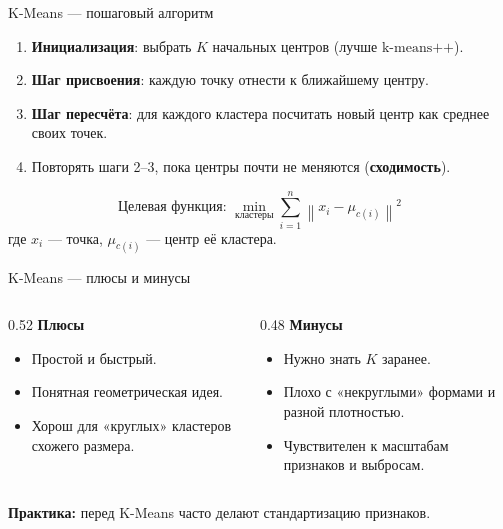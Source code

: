 \documentclass[aspectratio=169]{beamer}
\newcommand{\term}[1]{\textbf{#1}}
\begin{document}
\begin{frame}{K-Means — пошаговый алгоритм}
	\begin{enumerate}
		\item \term{Инициализация}: выбрать \(K\) начальных центров (лучше \(\text{k-means++}\)).
		\item \term{Шаг присвоения}: каждую точку отнести к ближайшему центру.
		\item \term{Шаг пересчёта}: для каждого кластера посчитать новый центр как среднее своих точек.
		\item Повторять шаги 2–3, пока центры почти не меняются (\term{сходимость}).
	\end{enumerate}
	\vspace{0.5em}
	\[
		\text{Целевая функция: }
		\min_{\text{кластеры}} \sum_{i=1}^{n} \left\|x_i - \mu_{c(i)}\right\|^2
	\]
	где \(x_i\) — точка, \(\mu_{c(i)}\) — центр её кластера.
\end{frame}

\begin{frame}{K-Means — плюсы и минусы}
	\begin{columns}[T]
		\begin{column}{0.52\textwidth}
			\textbf{Плюсы}
			\begin{itemize}
				\item Простой и быстрый.
				\item Понятная геометрическая идея.
				\item Хорош для «круглых» кластеров схожего размера.
			\end{itemize}
		\end{column}
		\begin{column}{0.48\textwidth}
			\textbf{Минусы}
			\begin{itemize}
				\item Нужно знать \(K\) заранее.
				\item Плохо с «некруглыми» формами и разной плотностью.
				\item Чувствителен к масштабам признаков и выбросам.
			\end{itemize}
		\end{column}
	\end{columns}
	\vspace{0.5em}
	\textbf{Практика:} перед K-Means часто делают стандартизацию признаков.
\end{frame}
\end{document}
